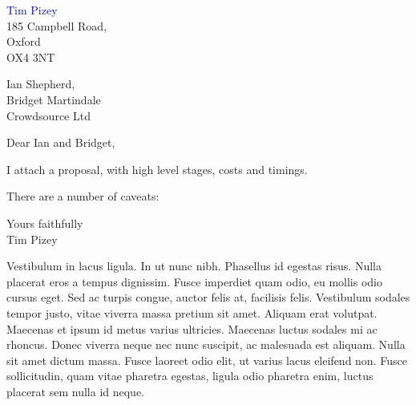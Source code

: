 \documentclass[12pt, a4paper]{article}
\newcommand{\fromName}{Tim Pizey}
\newcommand{\toName}{Ian  Shepherd, \\ Bridget Martindale}
\newcommand{\toAddress}{Crowdsource Ltd}
\newcommand{\fromAddress}{
\vspace{10 mm}
\hfill \textcolor{blue}{\Large \fromName} \\
\hspace*{0pt} \hfill 185 Campbell Road, \\
\hspace*{0pt} \hfill Oxford \\
\hspace*{0pt} \hfill  OX4 3NT
}
\begin{document}
\sffamily
\setlength\parindent{24pt}
\thispagestyle{plain}

\fromAddress

\noindent \toName \\ 
\noindent \toAddress


\vspace{10 mm}

\noindent Dear  Ian and Bridget, 
\vspace{7mm}

I attach a proposal, with high level stages, costs and timings. 

There are a number of caveats: 



 
\vspace{10 mm}
\setlength\parindent{33mm}
{\indent Yours faithfully}
\vspace{26 mm}\\
\setlength\parindent{36mm}
{\indent \fromName}
\setlength\parindent{24pt}



\newpage

{\color{red}Vestibulum in lacus ligula. In ut nunc nibh. Phasellus id egestas risus. Nulla placerat eros a tempus dignissim. Fusce imperdiet quam odio, eu mollis odio cursus eget. Sed ac turpis congue, auctor felis at, facilisis felis. Vestibulum sodales tempor justo, vitae viverra massa pretium sit amet. Aliquam erat volutpat. Maecenas et ipsum id metus varius ultricies. Maecenas luctus sodales mi ac rhoncus. Donec viverra neque nec nunc suscipit, ac malesuada est aliquam. Nulla sit amet dictum massa. Fusce laoreet odio elit, ut varius lacus eleifend non. Fusce sollicitudin, quam vitae pharetra egestas, ligula odio pharetra enim, luctus placerat sem nulla id neque.

}
 
 
 
\end{document}
